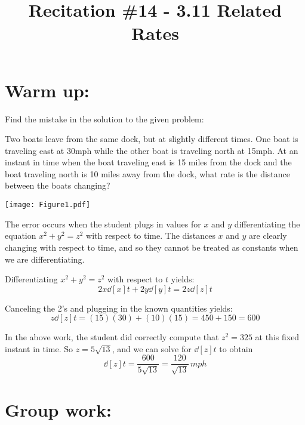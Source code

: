 \documentclass[handout,nooutcomes]{ximera}
\title{Recitation \#14 - 3.11 Related Rates}
\begin{document}
\begin{abstract}		\end{abstract}
\maketitle

\section*{Warm up:} 
Find the mistake in the solution to the given problem:

Two boats leave from the same dock, but at slightly different times.  One boat is traveling east at 30mph while the other boat is traveling north at 15mph.  At an instant in time when the boat traveling east is 15 miles from the dock and the boat traveling north is 10 miles away from the dock, what rate is the distance between the boats changing?

	\begin{image}
	\texttt{[image: Figure1.pdf]}
	\end{image}
	
		\begin{freeResponse}
		The error occurs when the student plugs in values for $x$ and $y$  differentiating the equation $x^2 + y^2 = z^2$ with respect to time.  The distances $x$ and $y$ are clearly changing with respect to time, and so they cannot be treated as constants when we are differentiating.
		
		Differentiating $x^2 + y^2 = z^2$ with respect to $t$ yields:
		$$ 2x \dd[x]{t} + 2y \dd[y]{t} = 2z \dd[z]{t}$$
		
		Canceling the 2's and plugging in the known quantities yields:
		$$ z \dd[z]{t} = (15)(30) + (10)(15) = 450 + 150 = 600 $$
		
		In the above work, the student did correctly compute that $z^2 = 325$ at this fixed instant in time.  So $z = 5\sqrt{13}$, and we can solve for $\dd[z]{t}$ to obtain
		$$ \dd[z]{t} = \frac{600}{5 \sqrt{13}} = \frac{120}{\sqrt{13}} \, mph $$
		\end{freeResponse}	
		
		
		

	
	
	
	
	

\section*{Group work:}
\end{document}
